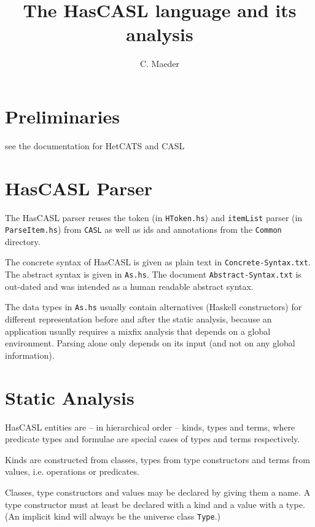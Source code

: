 \documentclass{article}
\begin{document}
\title{The HasCASL language and its analysis}

\author{C. Maeder}

\maketitle

\section{Preliminaries}

see the documentation for HetCATS and CASL

\section{HasCASL Parser}
The HasCASL parser reuses the token (in \texttt{HToken.hs}) and
\texttt{itemList} parser (in \texttt{ParseItem.hs}) from \texttt{CASL} as well
as ids and annotations from the \texttt{Common} directory.

The concrete syntax of HasCASL is given as plain text in
\texttt{Concrete-Syntax.txt}. The abstract syntax is given in
\texttt{As.hs}. The document \texttt{Abstract-Syntax.txt} is out-dated and was
intended as a human readable abstract syntax.

The data types in \texttt{As.hs} usually contain alternatives (Haskell
constructors) for different representation before and after the static
analysis, because an application usually requires a mixfix analysis that
depends on a global environment. Parsing alone only depends on its input
(and not on any global information).

\section{Static Analysis}

HasCASL entities are -- in hierarchical
order -- kinds, types and terms, where predicate types and formulae are
special cases of types and terms respectively.

Kinds are constructed from classes, types from type
constructors and terms from values, i.e. operations or predicates.

Classes, type constructors and values may be declared by giving them a name.
A type constructor must at least be declared with a kind and a value with a
type. (An implicit kind will always be the universe class \texttt{Type}.)
\end{document}
